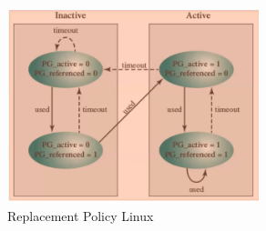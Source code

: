     \begin{figure}[H]
        \centering
        \includegraphics[width=0.65\textwidth]{immagini/ReplacementLinux}
        \caption{Replacement Policy Linux}
    \end{figure}

















































